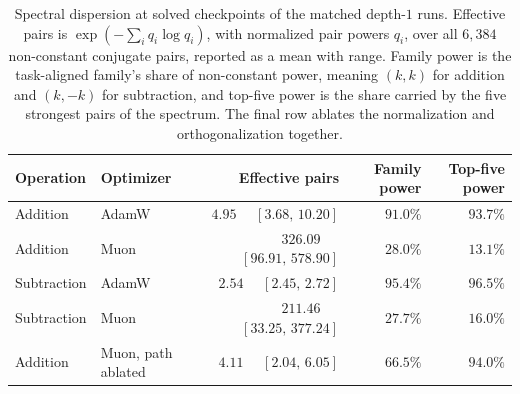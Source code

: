 \begin{table}[t]
\centering\small
\caption{Spectral dispersion at solved checkpoints of the matched depth-$1$ runs. Effective
pairs is $\exp(-\sum_i q_i\log q_i)$, with normalized pair powers $q_i$, over all $6{,}384$ non-constant conjugate pairs,
reported as a mean with range. Family power is the task-aligned family's share of
non-constant power, meaning $(k,k)$ for addition and $(k,-k)$ for subtraction, and top-five
power is the share carried by the five strongest pairs of the spectrum. The final row ablates the normalization and orthogonalization together.}
\label{tab:sparsity}
\begin{tabular}{llrrr}
\toprule
Operation & Optimizer & Effective pairs & Family power & Top-five power \\
\midrule
Addition & AdamW & $4.95$ \ \ $[3.68,\,10.20]$ & $91.0\%$ & $93.7\%$ \\
Addition & Muon & $326.09$ \ \ $[96.91,\,578.90]$ & $28.0\%$ & $13.1\%$ \\
\midrule
Subtraction & AdamW & $2.54$ \ \ $[2.45,\,2.72]$ & $95.4\%$ & $96.5\%$ \\
Subtraction & Muon & $211.46$ \ \ $[33.25,\,377.24]$ & $27.7\%$ & $16.0\%$ \\
\midrule
Addition & Muon, path ablated & $4.11$ \ \ $[2.04,\,6.05]$ & $66.5\%$ & $94.0\%$ \\
\bottomrule
\end{tabular}
\end{table}
